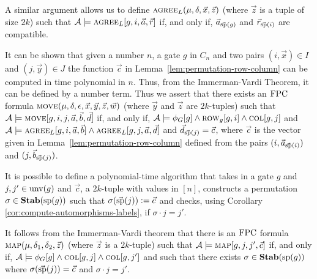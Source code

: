 \documentclass[../paper.tex]{subfiles}
\begin{document}

A similar argument allows us to define $\textsc{agree}_L (\mu, \delta , \vec{x},
\vec{z})$ (where $\vec{z}$ is a tuple of size $2k$) such that $\mathcal{A}
\models \textsc{agree}_L [g, i, \vec{a}, \vec{r}]$ if, and only if,
$\vec{a}_{\vec{\text{sp}}(g)}$ and $\vec{r}_{\vec{\text{sp}}(i)}$ are compatible.

It can be shown that given a number $n$, a gate $g$ in $C_n$ and two pairs $(i,
\vec{x}) \in I$ and $(j, \vec{y}) \in J$ the function $\vec{c}$ in
Lemma~\ref{lem:permutation-row-column} can be computed in time polynomial in
$n$. Thus, from the Immerman-Vardi Theorem, it can be defined by a number term.
Thus we assert that there exists an $\text{\upshape FPC}$ formula $\textsc{move} (\mu, \delta,
\epsilon, \vec{x}, \vec{y}, \vec{z}, \vec{w})$ (where $\vec{y}$ and $\vec{z}$
are $2k$-tuples) such that $\mathcal{A} \models \textsc{move} [g, i, j, \vec{a},
\vec{b}, \vec{d}]$ if, and only if, $\mathcal{A} \models \phi_G [g] \land
\textsc{row}_g[g,i] \land \textsc{col}[g, j]$ and $\mathcal{A} \models \textsc{agree}_L [g,
i, \vec{a}, \vec{b}] \land \textsc{agree}_L [g, j, \vec{a}, \vec{d}]$ and
$\vec{d}_{\vec{\text{sp}}(j)} = \vec{c}$, where $\vec{c}$ is the vector given in
Lemma~\ref{lem:permutation-row-column} defined from the pairs $(i,
\vec{a}_{\vec{\text{sp}}(i)})$ and $(j, \vec{b}_{\vec{\text{sp}}(j)})$.

It is possible to define a polynomial-time algorithm that takes in a gate $g$
and $j, j' \in \text{unv}(g)$ and $\vec{c}$, a $2k$-tuple with values in $[n]$,
constructs a permutation $\sigma \in \text{\textbf{Stab}} (\text{sp} (g))$ such that $\sigma
(\vec{\text{sp}}(j)) := \vec{c}$ and checks, using Corollary
\ref{cor:compute-automorphisms-labels}, if $\sigma \cdot j = j'$.

It follows from the Immerman-Vardi theorem that there is an $\text{\upshape FPC}$ formula
$\textsc{map}(\mu, \delta_1, \delta_2, \vec{z})$ (where $\vec{z}$ is a $2k$-tuple)
such that $\mathcal{A} \models \textsc{map}[g, j, j', \vec{c}]$ if, and only if,
$\mathcal{A} \models \phi_G [g] \land \textsc{col}[g, j] \land \textsc{col}[g, j']$ and
such that there exists $\sigma \in \text{\textbf{Stab}} (\text{sp} (g))$ where $\sigma (\vec{\text{sp}}(j)) =
\vec{c}$ and $\sigma \cdot j = j'$.
				
\end{document}
